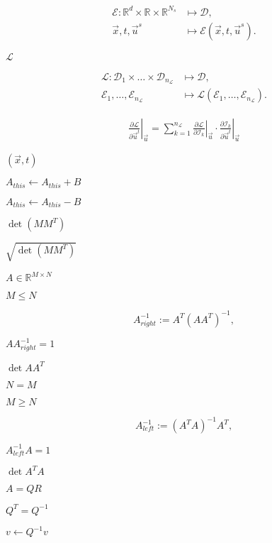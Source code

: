 \documentclass{article}
\begin{document}
\begin{align*} \mathcal{E}: \mathbb{R}^d \times \mathbb{R} \times \mathbb{R}^{N_s} &\mapsto \mathcal{D}, \\ \vec{x}, t, \vec{u}^s &\mapsto \mathcal{E}(\vec{x}, t, \vec{u}^s). \end{align*}
\pagebreak

$\mathcal{L}$
\pagebreak

\begin{align*} \mathcal{L}: \mathcal{D}_1 \times \dots \times \mathcal{D}_{n_{\mathcal{L}}} &\mapsto \mathcal{D}, \\ \mathcal{E}_1, \dots, \mathcal{E}_{n_{\mathcal{L}}} &\mapsto \mathcal{L}(\mathcal{E}_1, \dots, \mathcal{E}_{n_{\mathcal{L}}} ). \end{align*}
\pagebreak

\begin{align*} \left. \frac{\partial \mathcal{L}}{\partial \vec{u}^t} \right|_{\vec{u}} = \sum\limits_{k=1}^{n_{\mathcal{L}}} \left. \frac{\partial \mathcal{L}}{\partial \mathcal{I}_k} \right|_{\vec{u}} \cdot \left. \frac{\partial \mathcal{I}_k}{\partial \vec{u}^t} \right|_{\vec{u}} \end{align*}
\pagebreak

$ (\vec{x}, t) $
\pagebreak

$ A_{this} \leftarrow A_{this} + B$
\pagebreak

$ A_{this} \leftarrow A_{this} - B$
\pagebreak

$ \det(M M^T) $
\pagebreak

$ \sqrt{\det(M M^T)} $
\pagebreak

$ A \in \mathbb{R}^{M \times N} $
\pagebreak

$ M \leq N $
\pagebreak

\[ A^{-1}_{right} := A^T (A A^T)^{-1}, \]
\pagebreak

$ A A^{-1}_{right} = 1 $
\pagebreak

$ \det{A A^T} $
\pagebreak

$ N = M $
\pagebreak

$ M \geq N $
\pagebreak

\[ A^{-1}_{left} := (A^T A)^{-1} A^T, \]
\pagebreak

$ A^{-1}_{left} A = 1 $
\pagebreak

$ \det{A^T A} $
\pagebreak

$ A = Q R $
\pagebreak

$ Q^T = Q^{-1} $
\pagebreak

$ v \gets Q^{-1} v $
\pagebreak
\end{document}
